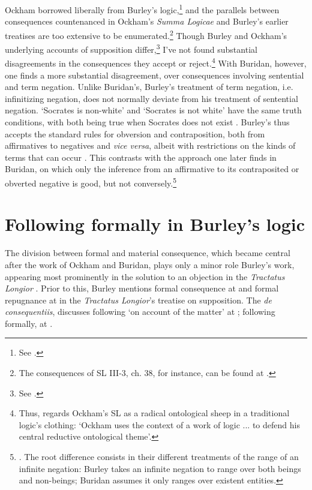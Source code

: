 \documentclass[]{article}
\begin{document}
Ockham borrowed liberally from Burley's logic,\footnote{See \cite{Brown1972}.} and the parallels between consequences countenanced in Ockham's \textit{Summa Logicae} and Burley's earlier treatises are too extensive to be enumerated.\footnote{The consequences of SL III-3, ch. 38, for instance, can be found at \cite[par. 1, 4, 9, 14-15, 71-72, and 86-88]{Green-Pedersen1980b}.} Though Burley and Ockham's underlying accounts of supposition differ,\footnote{See \cite{Wagner1981}.} I've not found substantial disagreements in the consequences they accept or reject.\footnote{Thus, \cite[p. 276]{Read2007} regards Ockham's SL as a radical ontological sheep in a traditional logic's clothing: `Ockham uses the context of a work of logic ... to defend his central reductive ontological theme'.} With Buridan, however, one finds a more substantial disagreement, over consequences involving sentential and term negation. Unlike Buridan's, Burley's treatment of term negation, i.e. infinitizing negation, does not normally deviate from his treatment of sentential negation. `Socrates is non-white' and `Socrates is not white' have the same truth conditions, with both being true when Socrates does not exist \cite[pp. 57.17-58.12; 215.6-21; 216.15-18]{BurleyDPAL}. Burley's thus accepts the standard rules for obversion and contraposition, both from affirmatives to negatives and \textit{vice versa}, albeit with restrictions on the kinds of terms that can occur \cite[pp. 129-131, par. 73-81]{Green-Pedersen1980b}. This contrasts with the approach one later finds in Buridan, on which only the inference from an affirmative to its contraposited or obverted negative is good, but not conversely.\footnote{\cite[p. 85]{Buridan2015}. The root difference consists in their different treatments of the range of an infinite negation: Burley takes an infinite negation to range over both beings and non-beings; Buridan assumes it only ranges over existent entities.}
\section{Following formally in Burley's logic}
The division between formal and material consequence, which became central after the work of Ockham and Buridan, plays only a minor role Burley's work, appearing most prominently in the solution to an objection in the \textit{Tractatus Longior} \cite[p. 80.13-29, 84.8-86.21]{BurleyDPAL}. Prior to this, Burley mentions formal consequence at \cite[p. 25.21]{BurleyDPAL} and formal repugnance at \cite[p. 39.20]{BurleyDPAL} in the \textit{Tractatus Longior}'s treatise on supposition. The \textit{de consequentiis}, discusses following `on account of the matter' at \cite[pp. 128-129, par. 70; 162-163, par. 168]{Green-Pedersen1980b}; following formally, at \cite[pp. 130, par. 75; 132, par. 84-85; 137, par. 106; 143, par. 118; 163, par. 168]{Green-Pedersen1980b}. 
\end{document}
